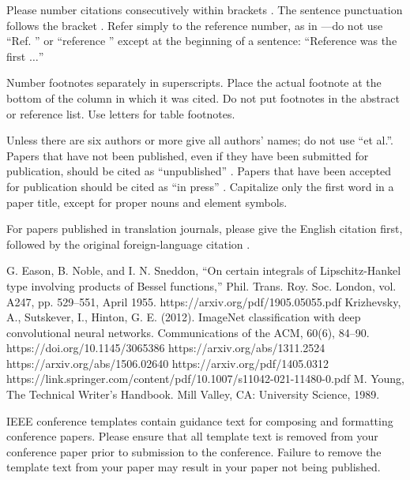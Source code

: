 \documentclass[conference]{IEEEtran}
\begin{document}
Please number citations consecutively within brackets \cite{b1}. The 
sentence punctuation follows the bracket \cite{b2}. Refer simply to the reference 
number, as in \cite{b3}---do not use ``Ref. \cite{b3}'' or ``reference \cite{b3}'' except at 
the beginning of a sentence: ``Reference \cite{b3} was the first $\ldots$''

Number footnotes separately in superscripts. Place the actual footnote at 
the bottom of the column in which it was cited. Do not put footnotes in the 
abstract or reference list. Use letters for table footnotes.

Unless there are six authors or more give all authors' names; do not use 
``et al.''. Papers that have not been published, even if they have been 
submitted for publication, should be cited as ``unpublished'' \cite{b4}. Papers 
that have been accepted for publication should be cited as ``in press'' \cite{b5}. 
Capitalize only the first word in a paper title, except for proper nouns and 
element symbols.

For papers published in translation journals, please give the English 
citation first, followed by the original foreign-language citation \cite{b6}.

\begin{thebibliography}{00}
 G. Eason, B. Noble, and I. N. Sneddon, ``On certain integrals of Lipschitz-Hankel type involving products of Bessel functions,'' Phil. Trans. Roy. Soc. London, vol. A247, pp. 529--551, April 1955.
 https://arxiv.org/pdf/1905.05055.pdf
 Krizhevsky, A., Sutskever, I., Hinton, G. E. (2012). ImageNet classification with deep convolutional neural networks. Communications of the ACM, 60(6), 84–90. https://doi.org/10.1145/3065386
 https://arxiv.org/abs/1311.2524
 https://arxiv.org/abs/1506.02640
 https://arxiv.org/pdf/1405.0312
 https://link.springer.com/content/pdf/10.1007/s11042-021-11480-0.pdf
 M. Young, The Technical Writer's Handbook. Mill Valley, CA: University Science, 1989.
\end{thebibliography}
\vspace{12pt}
\color{red}
IEEE conference templates contain guidance text for composing and formatting conference papers. Please ensure that all template text is removed from your conference paper prior to submission to the conference. Failure to remove the template text from your paper may result in your paper not being published.
\end{document}
